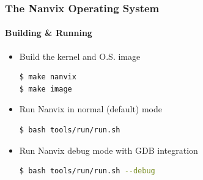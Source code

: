 \documentclass{beamer}
\begin{document}
	\begin{frame}[containsverbatim]
	\frametitle{The Nanvix Operating System}
	\framesubtitle{Building \& Running}
		\begin{itemize}
			\item Build the kernel and O.S. image
			\begin{lstlisting}[language=bash,numbers=none,frame=single]
$ make nanvix
$ make image
			\end{lstlisting}
		\end{itemize}

		\begin{itemize}
			\item Run Nanvix in normal (default) mode
				\begin{lstlisting}[language=bash,numbers=none,frame=single]
$ bash tools/run/run.sh
				\end{lstlisting}
		\end{itemize}

		\begin{itemize}
			\item Run Nanvix debug mode with GDB integration
				\begin{lstlisting}[language=bash,numbers=none,frame=single]
$ bash tools/run/run.sh --debug
				\end{lstlisting}
		\end{itemize}
	\end{frame}
\end{document}
